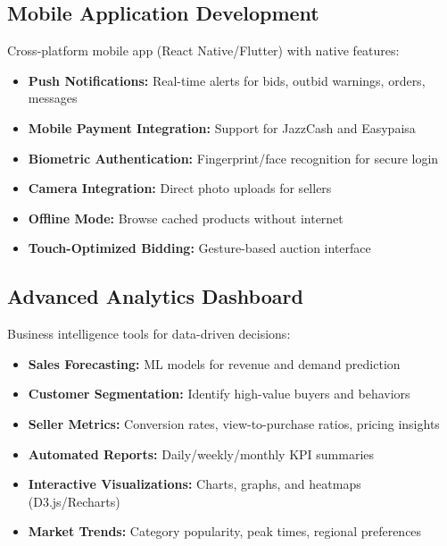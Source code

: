 \documentclass[12pt,a4paper]{article}
\begin{document}
\subsection{Mobile Application Development}
Cross-platform mobile app (React Native/Flutter) with native features:
\begin{itemize}
    \item \textbf{Push Notifications:} Real-time alerts for bids, outbid warnings, orders, messages
    \item \textbf{Mobile Payment Integration:} Support for JazzCash and Easypaisa
    \item \textbf{Biometric Authentication:} Fingerprint/face recognition for secure login
    \item \textbf{Camera Integration:} Direct photo uploads for sellers
    \item \textbf{Offline Mode:} Browse cached products without internet
    \item \textbf{Touch-Optimized Bidding:} Gesture-based auction interface
\end{itemize}

\subsection{Advanced Analytics Dashboard}
Business intelligence tools for data-driven decisions:
\begin{itemize}
    \item \textbf{Sales Forecasting:} ML models for revenue and demand prediction
    \item \textbf{Customer Segmentation:} Identify high-value buyers and behaviors
    \item \textbf{Seller Metrics:} Conversion rates, view-to-purchase ratios, pricing insights
    \item \textbf{Automated Reports:} Daily/weekly/monthly KPI summaries
    \item \textbf{Interactive Visualizations:} Charts, graphs, and heatmaps (D3.js/Recharts)
    \item \textbf{Market Trends:} Category popularity, peak times, regional preferences
\end{itemize}
\end{document}
